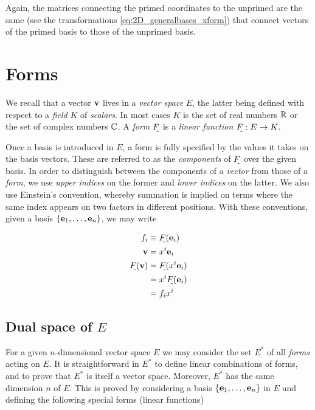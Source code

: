 Again, the matrices connecting the primed coordinates to the unprimed are the same (see the transformations  \ref{eq:2D_generalbases_xform}) that connect vectors of the primed basis to those of the unprimed basis.

\section{Forms}
We recall that a vector $\vb{v}$ lives in a \textit{vector space} $E$, the latter being defined with respect to a \textit{field} $K$ of \textit{scalars}. In most cases $K$ is the set of real numbers $\mathbb{R}$ or the set of complex numbers $\mathbb{C}$. A \textit{form} $\form{F}$ is a \textit{linear function} $\form{F} :E \rightarrow K$. 

Once a basis is introduced in $E$, a form is fully specified by the values it takes on the basis vectors. These are referred to as the \textit{components} of $\form{F}$ over the given basis. In order to distinguish between the components of a \textit{vector} from those of a \textit{form}, we use \textit{upper indices} on the former and \textit{lower indices} on the latter. We also use Einstein's convention, whereby summation is implied on terms where the same index appears on two factors in different positions. With these conventions, given a basis $\{\vb{e}_1, \ldots, \vb{e}_n\}$, we may write

\begin{subequations}
\label{eq:form_components}
\begin{align}   
f_i    &\equiv \form{F} (\vb{e}_i) \\
\vb{v} &= x^i \vb{e}_i \\
\form{F}(\vb{v}) &= \form{F}(x^i \vb{e}_i) \\
                 &= x^i  \form{F}(\vb{e}_i) \\
                 &= f_i x^i
\end{align}
\end{subequations}

\subsection{Dual space of $E$}
For a given $n$-dimensional vector space $E$ we may consider the set $E^*$ of all \textit{forms} acting on $E$. It is straightforward in $E^*$ to define linear combinations of forms, and to prove that $E^*$ is itself a vector space. Moreover, $E^*$ has the same dimension $n$ of $E$. This is proved by considering a basis $\{\vb{e}_1, \ldots, \vb{e}_n\}$ in $E$ and defining the following special forms (linear functions)

